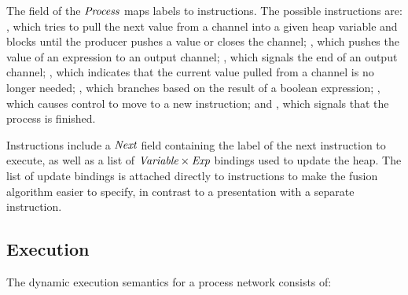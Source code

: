 The \lstiproc@instrs@ field of the $\textit{Process}$ maps labels to instructions.
The possible instructions are: \lstiproc@pull@, which tries to pull the next value from a channel into a given heap variable and blocks until the producer pushes a value or closes the channel; \lstiproc@push@, which pushes the value of an expression to an output channel; \lstiproc@close@, which signals the end of an output channel; \lstiproc@drop@, which indicates that the current value pulled from a channel is no longer needed; \lstiproc@case@, which branches based on the result of a boolean expression; \lstiproc@jump@, which causes control to move to a new instruction; and \lstiproc@exit@, which signals that the process is finished.

Instructions include a $\textit{Next}$ field containing the label of the next instruction to execute, as well as a list of $\textit{Variable} \times \textit{Exp}$ bindings used to update the heap.
The list of update bindings is attached directly to instructions to make the fusion algorithm easier to specify, in contrast to a presentation with a separate \lstiproc@update@ instruction.





\subsection{Execution}
\label{s:Process:Eval}

The dynamic execution semantics for a process network consists of:

